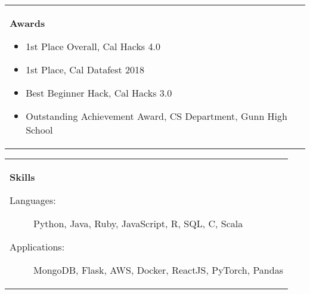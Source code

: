 \documentclass[letterpaper,8pt]{article}
\newcommand{\resitem}[1]{\item #1 \vspace{-1pt}}
\begin{document}
{\begin{tabular}[t]{@{}>{\raggedright\arraybackslash}p{}}
\textbf{\large{Awards}}
\vspace{0.1in}
\begin{itemize}[noitemsep,nolistsep]
    \item{\small{1st Place Overall, Cal Hacks 4.0}}
    \item{\small{1st Place, Cal Datafest 2018}}
    \item{\small{Best Beginner Hack, Cal Hacks 3.0}}
    \item{\small{Outstanding Achievement Award, CS Department, Gunn High School}}
\end{itemize}
\end{tabular}
\begin{tabular}[t]{@{}>{\raggedright\arraybackslash}p{}@{}}
\textbf{\large{Skills}}
\begin{description}
\resitem[Languages:]
\small{Python, Java, Ruby, JavaScript, R, SQL, C, Scala}
\resitem[Applications:]
        \small{MongoDB, Flask, AWS, Docker, ReactJS, PyTorch, Pandas}
\end{description}
\end{tabular}

}
\end{document}
